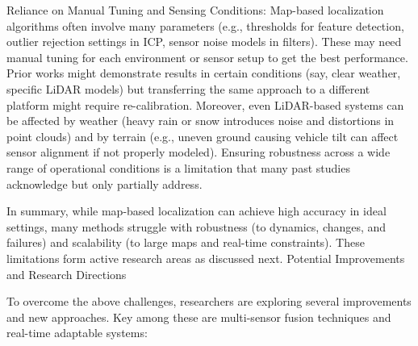     Reliance on Manual Tuning and Sensing Conditions: Map-based localization algorithms often involve many parameters (e.g., thresholds for feature detection, outlier rejection settings in ICP, sensor noise models in filters). These may need manual tuning for each environment or sensor setup to get the best performance. Prior works might demonstrate results in certain conditions (say, clear weather, specific LiDAR models) but transferring the same approach to a different platform might require re-calibration. Moreover, even LiDAR-based systems can be affected by weather (heavy rain or snow introduces noise and distortions in point clouds) and by terrain (e.g., uneven ground causing vehicle tilt can affect sensor alignment if not properly modeled). Ensuring robustness across a wide range of operational conditions is a limitation that many past studies acknowledge but only partially address.

In summary, while map-based localization can achieve high accuracy in ideal settings, many methods struggle with robustness (to dynamics, changes, and failures) and scalability (to large maps and real-time constraints). These limitations form active research areas as discussed next.
Potential Improvements and Research Directions

To overcome the above challenges, researchers are exploring several improvements and new approaches. Key among these are multi-sensor fusion techniques and real-time adaptable systems:

